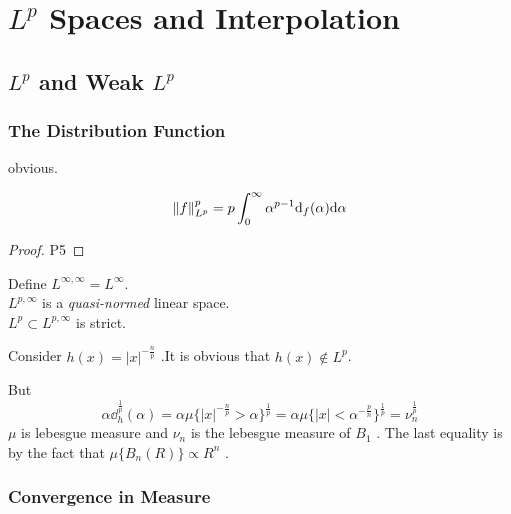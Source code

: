 \chapter{\texorpdfstring{$L^p$}. Spaces and Interpolation}

\section{\texorpdfstring{$L^p$}. and Weak \texorpdfstring{$L^p$}.}

\subsection{The Distribution Function}

\begin{proposition*}[1.1.3]
obvious.
\end{proposition*}

\begin{proposition*}[1.1.4]
\begin{equation*}
\norm{f}_{L^p}^p
=
p
\int_{0}^{\infty}
\alpha^{p-1}
\dd _f (\alpha)
\dd \alpha       
\end{equation*} 
\end{proposition*}

\begin{proof}
    P5
\end{proof}

\noindent Define $L^{\infty,\infty}=L^{\infty}$.
\\
\noindent $L^{p,\infty}$ is a {\it quasi-normed} linear space.
\\
\noindent $L^p\subset L^{p,\infty}$ is strict.

\begin{example*}
    Consider $h(x)=|x|^{-\frac{n}{p}}$ .It is obvious that $h(x)\not\in L^p$.
    \par
    But 
    \begin{equation*}
        \alpha \dd_h^{
            \frac{1}{p}
        }(\alpha)
        =\alpha\mu
        \{
        |x|^{-\frac{n}{p}}>\alpha
        \}^{\frac{1}{p}}
        =
        \alpha\mu\{
            |x|<\alpha^{-\frac{p}{n}}
        \}^{\frac{1}{p}}
        =\nu_n^{\frac{1}{p}}
    \end{equation*}
    $\mu$ is lebesgue measure and $\nu_n$ is the lebesgue measure of $B_1$ . The last equality is by the fact that $\mu\{B_n(R)\} \propto R^n$ . 
\end{example*}

\subsection{Convergence in Measure}

